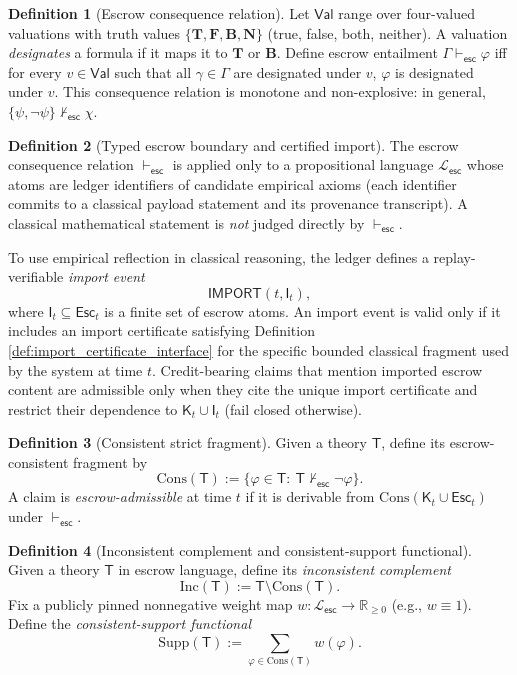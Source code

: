 \documentclass[11pt,a4paper]{article}
\newcommand{\R}{\mathbb{R}}
\theoremstyle{definition}
\newtheorem{definition}{Definition}
\theoremstyle{remark}
\begin{document}
\begin{definition}[Escrow consequence relation]\label{def:escrow_consequence}
Let $\mathsf{Val}$ range over four-valued valuations with truth values $\{\mathbf T,\mathbf F,\mathbf B,\mathbf N\}$ (true, false, both, neither).
A valuation \emph{designates} a formula if it maps it to $\mathbf T$ or $\mathbf B$.
Define escrow entailment $\Gamma\vdash_{\mathsf{esc}}\varphi$ iff for every $v\in\mathsf{Val}$ such that all $\gamma\in\Gamma$ are designated under $v$, $\varphi$ is designated under $v$.
This consequence relation is monotone and non-explosive: in general, $\{\psi,\neg\psi\}\nvdash_{\mathsf{esc}}\chi$.
\end{definition}
\begin{definition}[Typed escrow boundary and certified import]\label{def:escrow_boundary_and_import}
The escrow consequence relation $\vdash_{\mathsf{esc}}$ is applied only to a propositional language $\mathcal L_{\mathsf{esc}}$ whose atoms are ledger identifiers of candidate empirical axioms (each identifier commits to a classical payload statement and its provenance transcript).
A classical mathematical statement is \emph{not} judged directly by $\vdash_{\mathsf{esc}}$.

To use empirical reflection in classical reasoning, the ledger defines a replay-verifiable \emph{import event}
\[
\mathsf{IMPORT}(t,\mathsf I_t),
\]
where $\mathsf I_t\subseteq \mathsf{Esc}_t$ is a finite set of escrow atoms.
An import event is valid only if it includes an import certificate satisfying Definition \ref{def:import_certificate_interface} for the specific bounded classical fragment used by the system at time $t$.
Credit-bearing claims that mention imported escrow content are admissible only when they cite the unique import certificate and restrict their dependence to $\mathsf K_t\cup \mathsf I_t$ (fail closed otherwise).
\end{definition}

\begin{definition}[Consistent strict fragment]\label{def:escrow_consistent_fragment}
Given a theory $\mathsf T$, define its escrow-consistent fragment by
\[
\mathrm{Cons}(\mathsf T):=\{\varphi\in\mathsf T:\ \mathsf T\nvdash_{\mathsf{esc}}\neg\varphi\}.
\]
A claim is \emph{escrow-admissible} at time $t$ if it is derivable from $\mathrm{Cons}(\mathsf K_t\cup \mathsf{Esc}_t)$ under $\vdash_{\mathsf{esc}}$.
\end{definition}

\begin{definition}[Inconsistent complement and consistent-support functional]\label{def:inconsistent_complement_and_support}
Given a theory $\mathsf T$ in escrow language, define its \emph{inconsistent complement}
\[
\mathrm{Inc}(\mathsf T):=\mathsf T\setminus \mathrm{Cons}(\mathsf T).
\]
Fix a publicly pinned nonnegative weight map $w:\mathcal L_{\mathsf{esc}}\to\R_{\ge 0}$ (e.g., $w\equiv 1$).
Define the \emph{consistent-support functional}
\[
\mathrm{Supp}(\mathsf T):=\sum_{\varphi\in \mathrm{Cons}(\mathsf T)} w(\varphi).
\]
\end{definition}
\end{document}
